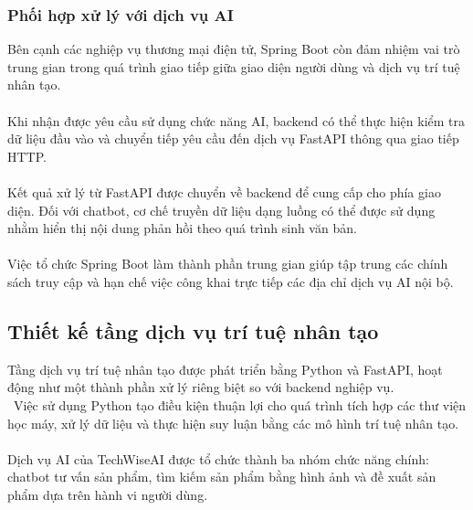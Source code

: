 \documentclass{report}
\begin{document}
\subsubsection{Phối hợp xử lý với dịch vụ AI}
Bên cạnh các nghiệp vụ thương mại điện tử, Spring
Boot còn đảm nhiệm vai trò trung gian trong quá
trình giao tiếp giữa giao diện người dùng và dịch
vụ trí tuệ nhân tạo.\\\\
Khi nhận được yêu cầu sử dụng chức năng AI, backend
có thể thực hiện kiểm tra dữ liệu đầu vào và chuyển
tiếp yêu cầu đến dịch vụ FastAPI thông qua giao
tiếp HTTP.\\\\
Kết quả xử lý từ FastAPI được chuyển về backend
để cung cấp cho phía giao diện. Đối với chatbot,
cơ chế truyền dữ liệu dạng luồng có thể được sử
dụng nhằm hiển thị nội dung phản hồi theo quá trình
sinh văn bản.\\\\
Việc tổ chức Spring Boot làm thành phần trung gian
giúp tập trung các chính sách truy cập và hạn chế
việc công khai trực tiếp các địa chỉ dịch vụ AI
nội bộ.

\subsection{Thiết kế tầng dịch vụ trí tuệ nhân tạo}
Tầng dịch vụ trí tuệ nhân tạo được phát triển bằng
Python và FastAPI, hoạt động như một thành phần
xử lý riêng biệt so với backend nghiệp vụ.\\\
Việc sử dụng Python tạo điều kiện thuận lợi cho
quá trình tích hợp các thư viện học máy, xử lý
dữ liệu và thực hiện suy luận bằng các mô hình
trí tuệ nhân tạo.\\\\
Dịch vụ AI của TechWiseAI được tổ chức thành ba
nhóm chức năng chính: chatbot tư vấn sản phẩm,
tìm kiếm sản phẩm bằng hình ảnh và đề xuất sản
phẩm dựa trên hành vi người dùng.
\end{document}
